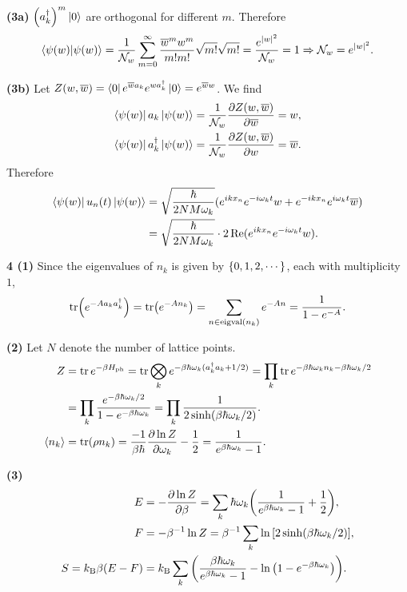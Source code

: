 \documentclass{article}
\makeatletter
\newcommand*{\shifttext}[1]{%
  \settowidth{\@tempdima}{#1}%
  \hspace{-\@tempdima}#1%
}
\newcommand{\plabel}[1]{%
\shifttext{\textbf{#1}\quad}%
}
\newcommand{\prule}{%
\begin{center}%
\hdashrule[0.5ex]{.99\linewidth}{1pt}{1pt 2.5pt}%
\end{center}%
}
\makeatother
\begin{document}
\plabel{(3a)}%
$\qty(a_k^\dagger)^m\ket{0}$ are orthogonal for different $m$. Therefore
\[ \bra{\psi(w)}\ket{\psi(w)} = \frac{1}{\mathcal{N}_w} \sum_{m=0}^\infty \frac{\overline{w}^m w^m}{m! m!} \sqrt{m!}\sqrt{m!} = \frac{e^{\abs{w}^2}}{\mathcal{N}_w} = 1 \Rightarrow \mathcal{N}_w = e^{\abs{w}^2}. \]

\plabel{(3b)}%
Let $Z(w,\overline{w}) = \bra{0} e^{\overline{w}a_k} e^{w a^\dagger_k} \ket{0} = e^{\overline{w}w}$. We find
\begin{align*}
    \bra{\psi(w)}a_k\ket{\psi(w)} &= \frac{1}{\mathcal{N}_w} \pdv{Z(w,\overline{w})}{\overline{w}} = w, \\
    \bra{\psi(w)}a_k^\dagger\ket{\psi(w)} &= \frac{1}{\mathcal{N}_w} \pdv{Z(w,\overline{w})}{w} = \overline{w}.
\end{align*}
Therefore
\begin{align*}
    \bra{\psi(w)}u_n(t)\ket{\psi(w)} &= \sqrt{\frac{\hbar}{2N M\omega_k}} (e^{ikx_n} e^{-i\omega_k t}w + e^{-ikx_n}e^{i\omega_k t}\overline{w}) \\
    &= \sqrt{\frac{\hbar}{2N M\omega_k}} \cdot 2\Re (e^{ikx_n} e^{-i\omega_k t}w).
\end{align*}

\prule
\plabel{4 (1)}%
Since the eigenvalues of $n_k$ is given by $\qty{0,1,2,\cdots}$, each with multiplicity $1$,
\[ \tr(e^{-Aa_k a^\dagger_k}) = \tr(e^{-An_k}) = \sum_{n\in\operatorname{eigval}(n_k)} e^{-An} = \frac{1}{1-e^{-A}}. \]

\plabel{(2)}%
Let $N$ denote the number of lattice points.
\begin{align*}
    Z &= \tr e^{-\beta H_{\mathrm{ph}}} = \tr \bigotimes_k e^{-\beta \hbar\omega_k (a^\dagger_k a_k + 1/2)} = \prod_k \tr e^{-\beta \hbar\omega_k n_k - \beta \hbar\omega_k/2} \\
    &= \prod_k \frac{e^{-\beta\hbar\omega_k/2}}{1-e^{-\beta\hbar\omega_k}} = \prod_k \frac{1}{2\sinh (\beta\hbar\omega_k/2)}. \\
    \langle n_k \rangle &= \tr(\rho n_k) = \frac{-1}{\beta\hbar} \pdv{\ln Z}{\omega_k} - \frac{1}{2} = \frac{1}{e^{\beta\hbar\omega_k} - 1}.
\end{align*}

\plabel{(3)}%
\abovedisplayskip=0pt\abovedisplayshortskip=0pt~\vspace*{-\baselineskip}%
\begin{align*}
    E &= -\pdv{\ln Z}{\beta} = \sum_k \hbar\omega_k \qty(\frac{1}{e^{\beta\hbar\omega_k} - 1} + \frac{1}{2}), \\
    F &= -\beta^{-1}\ln Z = \beta^{-1} \sum_k \ln \qty[2 \sinh(\beta\hbar\omega_k/2)], \\
    S = k_{\mathrm{B}}\beta(E - F) &= k_{\mathrm{B}}\sum_k \qty(\frac{\beta\hbar\omega_k}{e^{\beta\hbar\omega_k} - 1} - \ln\qty(1-e^{-\beta\hbar\omega_k})).
\end{align*}

% 
% 
\end{document}
